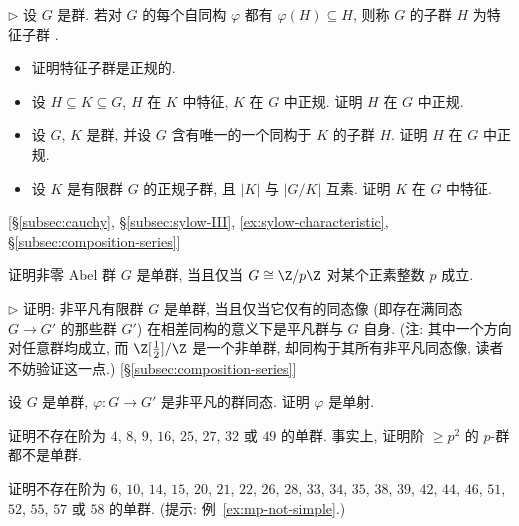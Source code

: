 \begin{prob}
\label{ex:characteristic-subgroup}
$\triangleright$ 设 $G$ 是群. 若对 $G$ 的每个自同构 $\varphi$ 都有 $\varphi(H) \subseteq H$, 则称 $G$ 的子群 $H$ 为特征子群%
.
\begin{itemize}
	\item 证明特征子群是正规的.
	\item 设 $H \subseteq K \subseteq G$, $H$ 在 $K$ 中特征, $K$ 在 $G$ 中正规. 证明 $H$ 在 $G$ 中正规.
	\item 设 $G$, $K$ 是群, 并设 $G$ 含有唯一的一个同构于 $K$ 的子群 $H$. 证明 $H$ 在 $G$ 中正规.
	\item 设 $K$ 是有限群 $G$ 的正规子群, 且 $|K|$ 与 $|G/K|$ 互素. 证明 $K$ 在 $G$ 中特征.
\end{itemize}
[\S\ref{subsec:cauchy}, \S\ref{subsec:sylow-III}, \ref{ex:sylow-characteristic}, \S\ref{subsec:composition-series}]
\end{prob}

\begin{prob}
\label{ex:abelian-simple}
证明非零 Abel 群 $G$ 是单群, 当且仅当 $G \cong \Z/p\Z$ 对某个正素整数 $p$ 成立.
\end{prob}

\begin{prob}
\label{ex:simple-hom-images}
$\triangleright$ 证明: 非平凡有限群 $G$ 是单群, 当且仅当它仅有的同态像 (即存在满同态 $G \to G'$ 的那些群 $G'$) 在相差同构的意义下是平凡群与 $G$ 自身. (注: 其中一个方向对任意群均成立, 而 $\Z[\frac{1}{2}]/\Z$ 是一个非单群, 却同构于其所有非平凡同态像, 读者不妨验证这一点.) [\S\ref{subsec:composition-series}]
\end{prob}

\begin{prob}
\label{ex:simple-injective}
设 $G$ 是单群, $\varphi : G \to G'$ 是非平凡的群同态. 证明 $\varphi$ 是单射.
\end{prob}

\begin{prob}
\label{ex:no-simple-p-powers}
证明不存在阶为 $4$, $8$, $9$, $16$, $25$, $27$, $32$ 或 $49$ 的单群. 事实上, 证明阶 $\geq p^2$ 的 $p$-群都不是单群.
\end{prob}

\begin{prob}
\label{ex:no-simple-list}
证明不存在阶为 $6$, $10$, $14$, $15$, $20$, $21$, $22$, $26$, $28$, $33$, $34$, $35$, $38$, $39$, $42$, $44$, $46$, $51$, $52$, $55$, $57$ 或 $58$ 的单群. (提示: 例~\ref{ex:mp-not-simple}.)
\end{prob}


